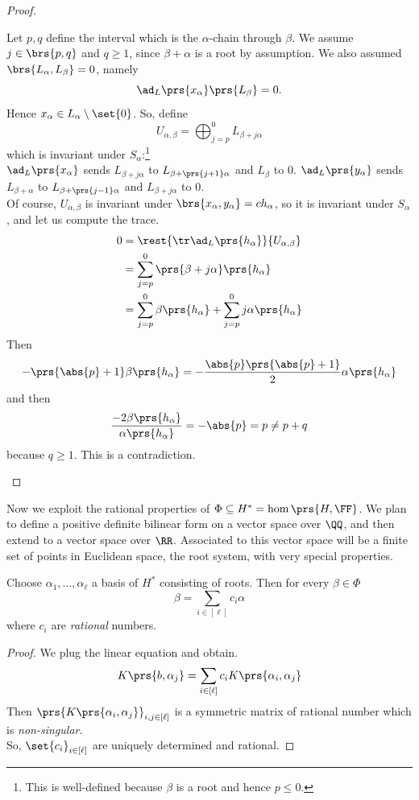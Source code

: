 \documentclass[10pt,a4paper,twoside,openany,hidelinks]{book}
\begin{document}
\begin{proof}
\begin{enumerate}
Let $p,q$ define the interval which is the $\alpha$-chain through $\beta$. We assume
$j \in \brs{p,q}$ and $q \geq 1$, since $\beta + \alpha$ is a root by assumption.
We also assumed $\brs{L_{\alpha}, L_{\beta}} = 0$, namely
\[\ad_L\prs{x_{\alpha}}\prs{L_{\beta}} = 0 \text{.}\]
Hence $x_{\alpha} \in L_{\alpha} \setminus \set{0}$.
So, define
\[U_{\alpha,\beta} = \bigoplus_{j=p}^0 L_{\beta + j\alpha}\]
which is invariant under $S_{\alpha}$:\footnote{This is well-defined because $\beta$ is a root and hence $p \leq 0$.}\\
$\ad_L\prs{x_{\alpha}}$ sends $L_{\beta + j\alpha}$ to $L_{\beta + \prs{j+1}\alpha}$ and $L_{\beta}$ to $0$. $\ad_L\prs{y_{\alpha}}$ sends $L_{\beta + \alpha}$ to $L_{\beta + \prs{j-1}\alpha}$ and $L_{\beta + j\alpha}$ to $0$.\\
Of course, $U_{\alpha,\beta}$ is invariant under $\brs{x_{\alpha},y_{\alpha}} = ch_{\alpha}$, so it is invariant under $S_{\alpha}$, and let us compute the trace.
\begin{align*}
0 &= \rest{\tr \ad_L\prs{h_{\alpha}}}{U_{\alpha,\beta}} \\&=
\sum_{j=p}^0 \prs{\beta + j\alpha}\prs{h_{\alpha}} \\&= \sum_{j=p}^0 \beta\prs{h_{\alpha}} + \sum_{j=p}^0 j\alpha\prs{h_{\alpha}}
\end{align*}
Then
\[- \prs{\abs{p} + 1}\beta\prs{h_{\alpha}} = -\frac{\abs{p}\prs{\abs{p} + 1}}{2} \alpha\prs{h_{\alpha}}\]
and then
\[\frac{-2 \beta\prs{h_{\alpha}}}{\alpha\prs{h_{\alpha}}} = -\abs{p} = p \neq p + q\]
because $q \geq 1$. This is a contradiction.
\end{enumerate}
\end{proof}

Now we exploit the rational properties of $\Phi \subseteq H^* = \hom\prs{H,\FF}$. We plan to define a positive definite bilinear form on a vector space over $\QQ$, and then extend to a vector space over $\RR$. Associated to this vector space will be a finite set of points in Euclidean space, the root system, with very special properties.

\begin{proposition}
Choose $\alpha_1, \ldots, \alpha_{\ell}$ a basis of $H^*$ consisting of roots. Then for every $\beta \in \Phi$
\[\beta = \sum_{i\in[\ell]} c_i \alpha\]
where $c_i$ are \emph{rational} numbers.
\end{proposition}
\begin{proof}
We plug the linear equation and obtain.
\[K\prs{b, \alpha_j} = \sum_{i\in[\ell]} c_i K\prs{\alpha_i, \alpha_j}\]
Then $\prs{K\prs{\alpha_i, \alpha_j}}_{i,j \in [\ell]}$ is a symmetric matrix of rational number which is \emph{non-singular}.\\
So, $\set{c_i}_{i \in [\ell]}$ are uniquely determined and rational.
\end{proof}
\end{document}
